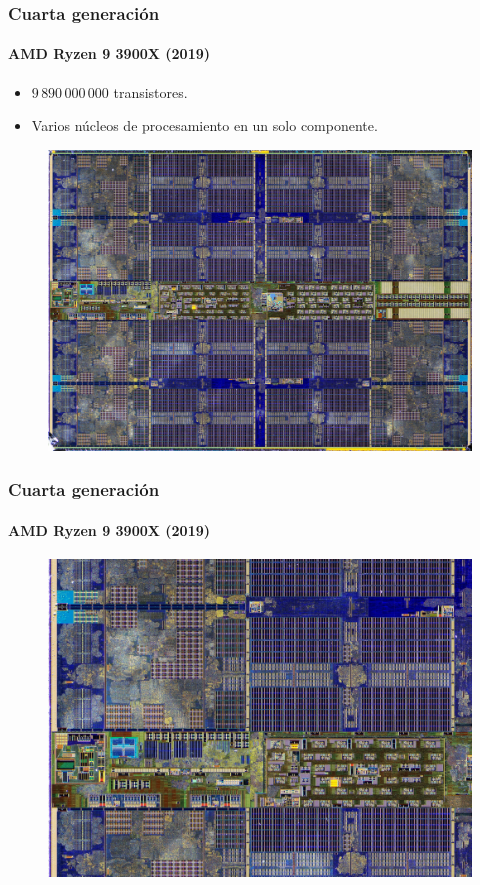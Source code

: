 \documentclass[11pt,a4paper,spanish]{beamer}
\begin{document}
\begin{frame}

\frametitle{Cuarta generación}
\framesubtitle{AMD Ryzen 9 3900X (2019)}

\begin{itemize}
    \item $9\,890\,000\,000$ transistores.
    \item Varios núcleos de procesamiento en un solo componente.
\end{itemize}

\begin{figure}
    \includegraphics[height=0.75\textheight]{img/amd.jpg}
    \captionsetup{textfont=tiny,labelformat=empty}
    \caption{}
\end{figure}

\end{frame}

\begin{frame}

\frametitle{Cuarta generación}
\framesubtitle{AMD Ryzen 9 3900X (2019)}

\begin{figure}
    \includegraphics[height=0.90\textheight]{img/amd_zoom.jpg}
    \captionsetup{textfont=tiny,labelformat=empty}
    \caption{}
\end{figure}

\end{frame}
\end{document}
